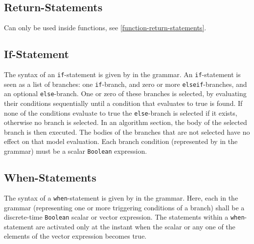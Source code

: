 \subsection{Return-Statements}\label{return-statements}

Can only be used inside functions, see \cref{function-return-statements}.


\subsection{If-Statement}\label{if-statement}

The syntax of an \lstinline!if!-statement is given by  in the grammar.
An \lstinline!if!-statement is seen as a list of branches: one \lstinline!if!-branch, and zero or more \lstinline!elseif!-branches, and an optional \lstinline!else!-branch.
One or zero of these branches is selected, by evaluating their conditions sequentially until a condition that evaluates to true is found.
If none of the conditions evaluate to true the \lstinline!else!-branch is selected if it exists, otherwise no branch is selected.
In an algorithm section, the body of the selected branch is then executed.
The bodies of the branches that are not selected have no effect on that model evaluation.
Each branch condition (represented by  in the grammar) must be a scalar \lstinline!Boolean! expression.


\subsection{When-Statements}\label{when-statements}

The syntax of a \lstinline!when!-statement is given by  in the grammar.
Here, each  in the grammar (representing one or more triggering conditions of a branch) shall be a discrete-time \lstinline!Boolean! scalar or vector expression.
The statements within a \lstinline!when!-statement are activated only at the instant when the scalar or any one of the elements of the vector expression becomes true.

